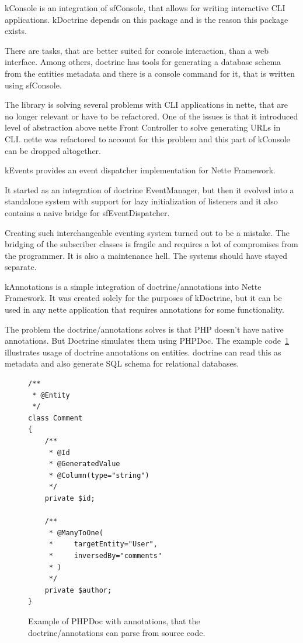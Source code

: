  \label{sec:state:console}

\gls{kConsole} is an integration of \gls{sfConsole}, that allows for writing interactive CLI applications. \gls{kDoctrine} depends on this package and is the reason this package exists.

There are tasks, that are better suited for console interaction, than a web interface. Among others, \gls{doctrine} has tools for generating a database schema from the entities metadata and there is a console command for it, that is written using \gls{sfConsole}.

The library is solving several problems with CLI applications in \gls{nette}, that are no longer relevant or have to be refactored. One of the issues is that it introduced level of abstraction above \gls{nette} Front Controller to solve generating URLs in CLI. \gls{nette} was refactored to account for this problem and this part of \gls{kConsole} can be dropped altogether.

 \label{sec:state:events}

\gls{kEvents} provides an event dispatcher implementation for Nette Framework.

It started as an integration of \gls{doctrine} EventManager, but then it evolved into a standalone system with support for lazy initialization of listeners and it also contains a naive bridge for \gls{sfEventDispatcher}.

Creating such interchangeable eventing system turned out to be a mistake. The bridging of the subscriber classes is fragile and requires a lot of compromises from the programmer. It is also a maintenance hell. The systems should have stayed separate.

 \label{sec:state:annotations}

\gls{kAnnotations} is a simple integration of doctrine/annotations into Nette Framework. It was created solely for the purposes of \gls{kDoctrine}, but it can be used in any \gls{nette} application that requires annotations for some functionality.

The problem the doctrine/annotations solves is that PHP doesn't have native annotations. But Doctrine simulates them using PHPDoc. The example code~\ref{fig:php:annotations-example} illustrates usage of \gls{doctrine} annotations on entities. \gls{doctrine} can read this as metadata and also generate SQL schema for relational databases.

\begin{figure} \label{fig:php:annotations-example}
\begin{lstlisting}
/**
 * @Entity
 */
class Comment
{
    /**
     * @Id
     * @GeneratedValue
     * @Column(type="string")
     */
    private $id;

    /**
     * @ManyToOne(
     *     targetEntity="User",
     *     inversedBy="comments"
     * )
     */
    private $author;
}
\end{lstlisting}
\caption{Example of PHPDoc with annotations, that the doctrine/annotations can parse from source code.}
\end{figure}

